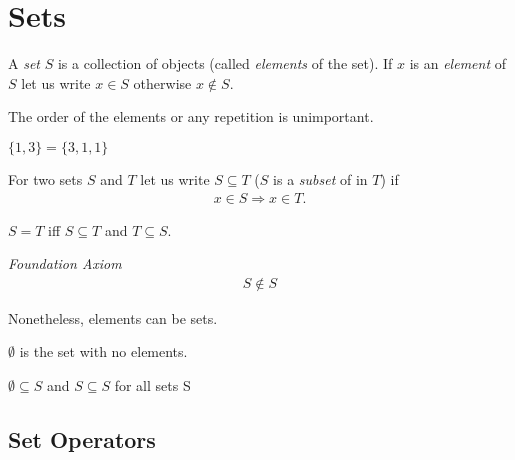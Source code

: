 

\section{Sets}
\begin{df}
A \emph{set} $S$ is a collection of objects (called \emph{elements} of the set). If $x$ is an \emph{element} of $S$ let us write $x \in S$ otherwise $x \notin S$.
\end{df}
\begin{rk}
The order of the elements or any repetition is unimportant.
\end{rk}
\begin{ex} \qquad 
$\displaystyle \{1,3 \} = \{ 3,1,1 \}$
\end{ex}
\begin{df}
For two sets $S$ and $T$ let us write $S \subseteq T$ ($S$ is a \emph{subset} of in $T$) if 
\begin{align*}
x \in S \Rightarrow x \in T.
\end{align*}
\end{df}

\begin{df}
$S=T$ iff $S \subseteq T$ and $T \subseteq S$.
\end{df}

\begin{ax} \emph{Foundation Axiom} 
\begin{align*}
S \notin S
\end{align*}
\end{ax}

\begin{rk}
Nonetheless, elements can be sets.
\end{rk}

\begin{df}
$\emptyset$ is the set with no elements.
\end{df}

\begin{pr}
$\emptyset \subseteq S$ and $S \subseteq S$ for all sets S
\end{pr}

\subsection{Set Operators}

\def\firstcircle{(0,0) circle (1.5cm)}
\def\secondcircle{(0:2cm) circle (1.5cm)}



